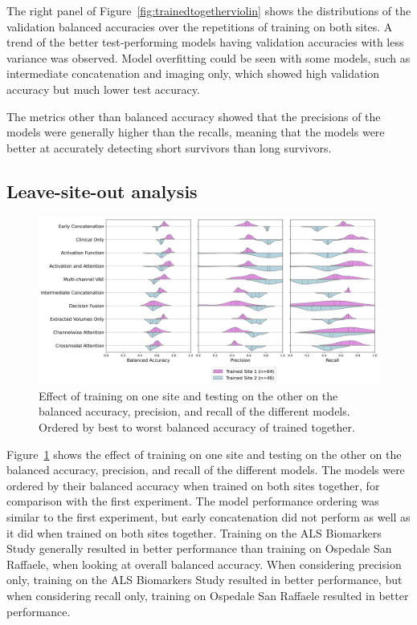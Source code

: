 The right panel of Figure~\ref{fig:trainedtogetherviolin} shows the distributions of the validation balanced accuracies over the repetitions of training on both sites.
A trend of the better test-performing models having validation accuracies with less variance was observed.
Model overfitting could be seen with some models, such as intermediate concatenation and imaging only, which showed high validation accuracy but much lower test accuracy.

The metrics other than balanced accuracy showed that the precisions of the models were generally higher than the recalls, meaning that the models were better at accurately detecting short survivors than long survivors.

\subsection{Leave-site-out analysis}

\begin{figure}
    \centering
    \hspace*{-2cm}
    \includegraphics[width=1.2\textwidth]{figures/violinplot_site_effect}
    \caption{Effect of training on one site and testing on the other on the balanced accuracy, precision, and recall of the different models. Ordered by best to worst balanced accuracy of trained together.}
    \label{fig:site_effect}
\end{figure}

Figure~\ref{fig:site_effect} shows the effect of training on one site and testing on the other on the balanced accuracy, precision, and recall of the different models.
The models were ordered by their balanced accuracy when trained on both sites together, for comparison with the first experiment.
The model performance ordering was similar to the first experiment, but early concatenation did not perform as well as it did when trained on both sites together.
Training on the ALS Biomarkers Study generally resulted in better performance than training on Ospedale San Raffaele, when looking at overall balanced accuracy.
When considering precision only, training on the ALS Biomarkers Study resulted in better performance, but when considering recall only, training on Ospedale San Raffaele resulted in better performance.


